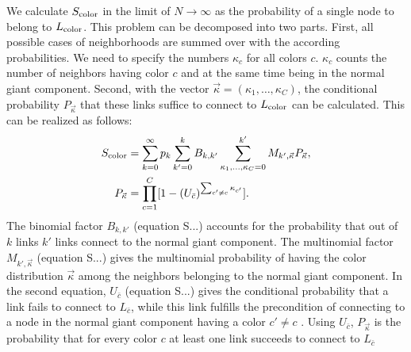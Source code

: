 \documentclass[aps, pre, twocolumn, a4paper, floatfix]{revtex4}
\begin{document}
{We calculate $S_{\rm color}$ in the limit of $N\to \infty$ as the probability of a 
single node to belong to $L_{\rm color}$. This problem can be decomposed into two parts. 
First, all possible cases of neighborhoods are summed over with the according 
probabilities. We need to specify the numbers $\kappa_c$ for all colors $c$. $\kappa_c$ 
counts the number of neighbors having color $c$ and at the same time being in the normal
giant component. Second, with the vector ${\vec \kappa}=(\kappa_1,\dots,\kappa_C)$, the conditional 
probability $P_{\vec \kappa}$ that these links suffice to connect to $L_{\rm color}$ can 
be calculated. This can be realized as follows:
\begin{align}
S_{\rm color} &= \sum_{k=0}^{\infty}p_k \sum_{k'=0}^{k} B_{k,k'} 
\sum_{\kappa_1,\dots, \kappa_C=0}^{k'} M_{k',\vec \kappa} 
P_{\vec \kappa},\label{eq:s_color}\\
P_{\vec \kappa} &= \prod_{c=1}^C [1-(U_{\bar c})^{\sum_{c'\neq c} \kappa_{c'} }].
\end{align}
The binomial factor $B_{k,k'}$ (equation S...) accounts for the probability that out of 
$k$ links $k'$ links connect to the normal giant component. The multinomial factor 
$M_{k',\vec \kappa}$ (equation S...) gives the multinomial probability of having the color 
distribution ${\vec \kappa}$ among the neighbors belonging to the normal giant component. 
In the second equation, $U_{\bar c}$ (equation S...) gives the conditional probability that a link 
fails to connect to $L_{\bar c}$, while this 
link fulfills the precondition of connecting to a node in the normal giant component 
having a color $c'\neq c$ . Using $U_{\bar c}$, $P_{\vec \kappa}$ is the probability that for every 
color $c$ at least one link succeeds to connect to $L_{\bar c}$

}
\end{document}
